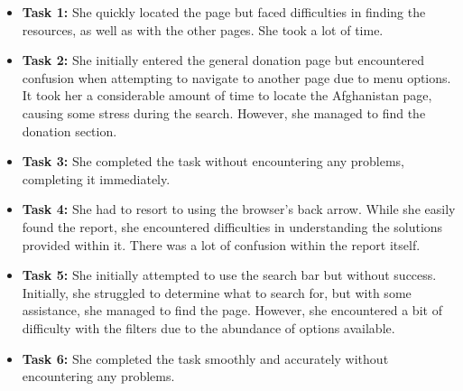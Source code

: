 \begin{itemize}
    \item \textbf{Task 1:} She quickly located the page but faced difficulties in finding the resources, as well as with the other pages. She took a lot of time.
    \item \textbf{Task 2:} She initially entered the general donation page but encountered confusion when attempting to navigate to another page due to menu options. It took her a considerable amount of time to locate the Afghanistan page, causing some stress during the search. However, she managed to find the donation section.
    \item \textbf{Task 3:} She completed the task without encountering any problems, completing it immediately.
    \item \textbf{Task 4:} She had to resort to using the browser's back arrow. While she easily found the report, she encountered difficulties in understanding the solutions provided within it. There was a lot of confusion within the report itself.
    \item \textbf{Task 5:} She initially attempted to use the search bar but without success. Initially, she struggled to determine what to search for, but with some assistance, she managed to find the page. However, she encountered a bit of difficulty with the filters due to the abundance of options available.
    \item \textbf{Task 6:} She completed the task smoothly and accurately without encountering any problems.
\end{itemize}





\vspace{1cm}

